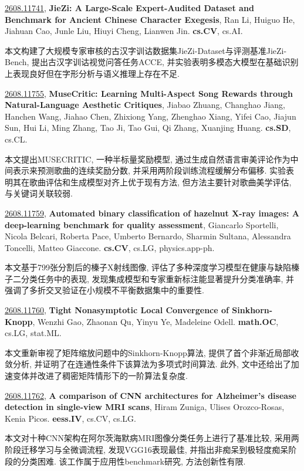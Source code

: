 \documentclass[9pt, a4paper]{article}
\theoremstyle{plain}
\theoremstyle{definition}
\theoremstyle{remark}
\newcommand{\arxivwithtarget}[3]{\hypertarget{#1}{}\href{https://arxiv.org/abs/#1}{#1}, \textbf{\textcolor{arxivblue}{#2}}, #3. }
\begin{document}
\arxivwithtarget{2608.11741}{JieZi: A Large-Scale Expert-Audited Dataset and Benchmark for Ancient Chinese Character Exegesis}{Ran Li, Huiguo He, Jiahuan Cao, Junle Liu, Hiuyi Cheng, Lianwen Jin}\textbf{cs.CV}, cs.AI.

本文构建了大规模专家审核的古汉字训诂数据集JieZi-Dataset与评测基准JieZi-Bench, 提出古汉字训诂视觉问答任务ACCE, 并实验表明多模态大模型在基础识别上表现良好但在字形分析与语义推理上存在不足.


\arxivwithtarget{2608.11755}{MuseCritic: Learning Multi-Aspect Song Rewards through Natural-Language Aesthetic Critiques}{Jiabao Zhuang, Changhao Jiang, Hanchen Wang, Jiahao Chen, Zhixiong Yang, Zhenghao Xiang, Yifei Cao, Jiajun Sun, Hui Li, Ming Zhang, Tao Ji, Tao Gui, Qi Zhang, Xuanjing Huang}\textbf{cs.SD}, cs.CL.

本文提出MUSECRITIC, 一种半标量奖励模型, 通过生成自然语言审美评论作为中间表示来预测歌曲的连续奖励分数, 并采用两阶段训练流程缓解分布偏移. 实验表明其在歌曲评估和生成模型对齐上优于现有方法, 但方法主要针对歌曲美学评估, 与关键词关联较弱.


\arxivwithtarget{2608.11759}{Automated binary classification of hazelnut X-ray images: A deep-learning benchmark for quality assessment}{Giancarlo Sportelli, Nicola Belcari, Roberta Pace, Umberto Bernardo, Sharmin Sultana, Alessandra Toncelli, Matteo Giaccone}\textbf{cs.CV}, cs.LG, physics.app-ph.

本文基于799张分割后的榛子X射线图像, 评估了多种深度学习模型在健康与缺陷榛子二分类任务中的表现, 发现集成模型和专家重新标注能显著提升分类准确率, 并强调了多折交叉验证在小规模不平衡数据集中的重要性.


\arxivwithtarget{2608.11760}{Tight Nonasymptotic Local Convergence of Sinkhorn-Knopp}{Wenzhi Gao, Zhaonan Qu, Yinyu Ye, Madeleine Odell}\textbf{math.OC}, cs.LG, stat.ML.

本文重新审视了矩阵缩放问题中的Sinkhorn-Knopp算法, 提供了首个非渐近局部收敛分析, 并证明了在连通性条件下该算法为多项式时间算法. 此外, 文中还给出了加速变体并改进了稠密矩阵情形下的一阶算法复杂度.


\arxivwithtarget{2608.11762}{A comparison of CNN architectures for Alzheimer's disease detection in single-view MRI scans}{Hiram Zuniga, Ulises Orozco-Rosas, Kenia Picos}\textbf{eess.IV}, cs.CV, cs.LG.

本文对十种CNN架构在阿尔茨海默病MRI图像分类任务上进行了基准比较, 采用两阶段迁移学习与全微调流程, 发现VGG16表现最佳, 并指出非痴呆到极轻度痴呆阶段的分类困难. 该工作属于应用性benchmark研究, 方法创新性有限.
\end{document}
